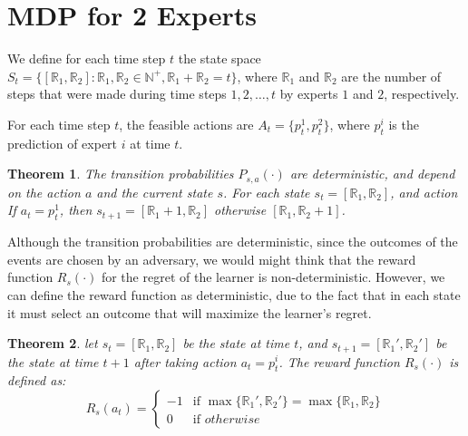 \documentclass[a4paper, 12pt]{article}
\newtheorem{theorem}{Theorem}
\begin{document}
\section*{MDP for 2 Experts}


We define for each time step $t$ the state space 
$S_t = \{ [ \mathbb{R}_1 ,  \mathbb{R}_2 ] : \mathbb{R}_1, \mathbb{R}_2 \in \mathbb{N}^+ , \mathbb{R}_1 + \mathbb{R}_2 = t \}$,  
where $\mathbb{R}_1$ and $\mathbb{R}_2$ are the number of steps that were made during time steps $1, 2, \ldots, t$ by experts $1$ and $2$, respectively.

For each time step $t$, the feasible actions are $A_t = \{p_t^1, p_t^2\}$, where $p_t^i$ is the prediction of expert $i$ at time $t$.

\medskip

\begin{theorem}

The transition probabilities $P_{s,a}(\cdot)$ are deterministic, and depend on the action $a$ and the current state $s$.
For each state $s_t = [ \mathbb{R}_1 ,  \mathbb{R}_2 ]$, and action If $a_t = p_t^1$, then $s_{t+1} = [ \mathbb{R}_1 + 1 ,  \mathbb{R}_2 ]$ 
otherwise $[ \mathbb{R}_1 ,  \mathbb{R}_2 + 1 ]$.

\end{theorem}

\medskip 

Although the transition probabilities are deterministic, since the outcomes of the events are chosen by an adversary, 
we would might think that the reward function $R_s(\cdot)$ for the regret of the learner is non-deterministic.
However, we can define the reward function as deterministic, due to the fact that in each state it must select an outcome 
that will maximize the learner's regret.

\begin{theorem}

    let $s_t = [ \mathbb{R}_1 ,  \mathbb{R}_2 ]$ be the state at time $t$, and $s_{t+1} = [ \mathbb{R}_1' ,  \mathbb{R}_2' ]$ be the state at time $t+1$
    after taking action $a_t = p_t^i$.
    The reward function $R_s(\cdot)$ is defined as:
    \[
    R_s(a_t) = \begin{cases} 
        -1 & \text{if } \max\{ \mathbb{R}_1' ,  \mathbb{R}_2' \} = \max\{ \mathbb{R}_1 ,  \mathbb{R}_2 \} \\
        0 & \text{if } otherwise
    \end{cases}
    \]

\end{theorem}
\end{document}
